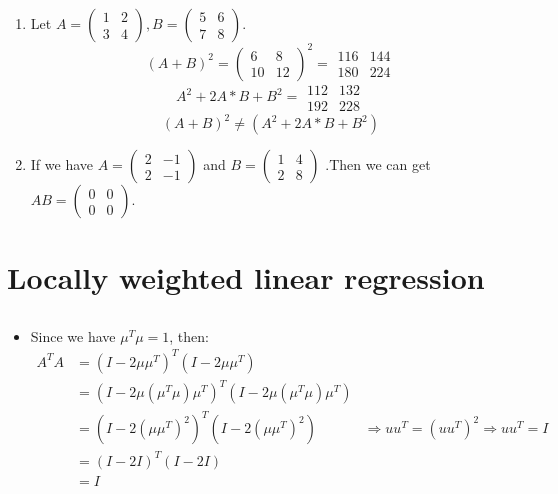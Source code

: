 \documentclass[pdftex,11pt]{article}
\begin{document}
\begin{enumerate}
\begin{enumerate}
\item Let $A=\left(\begin{array}{cc}
1 & 2\\
3 & 4
\end{array}\right),B=\left(\begin{array}{cc}
5 & 6\\
7 & 8
\end{array}\right)$. 
\[
(A+B)^{2}=\left(\begin{array}{cc}
6 & 8\\
10 & 12
\end{array}\right)^{2}=\begin{array}{cc}
116 & 144\\
180 & 224
\end{array}
\]
\[
A^{2}+2A*B+B^{2}=\begin{array}{cc}
112 & 132\\
192 & 228
\end{array}
\]
\[
(A+B)^{2}\neq(A^{2}+2A*B+B^{2})
\]
\item If we have $A=\left(\begin{array}{cc}
2 & -1\\
2 & -1
\end{array}\right)$ and $B=\left(\begin{array}{cc}
1 & 4\\
2 & 8
\end{array}\right)$ .Then we can get $AB=\left(\begin{array}{cc}
0 & 0\\
0 & 0
\end{array}\right)$.
\end{enumerate}
\end{enumerate}

\section{Locally weighted linear regression}

	\subsection{}
	\begin{itemize}
		\item Since we have $\mu^T\mu = 1$, then:
		\begin{align*}
		A^TA 
		&= (I - 2\mu\mu^T)^T (I - 2\mu\mu^T) \\
		&= (I - 2\mu(\mu^T\mu)\mu^T)^T(I - 2\mu(\mu^T\mu)\mu^T)\\
		&= (I - 2(\mu\mu^T)^2)^T(I - 2(\mu\mu^T)^2)         &\Longrightarrow  uu^{T}=(uu^{T})^{2} \Longrightarrow  uu^{T}=I\\
		&= (I - 2I)^T(I - 2I)\\
		& =I\\
		\end{align*}
	\end{itemize}
	
\end{document}

